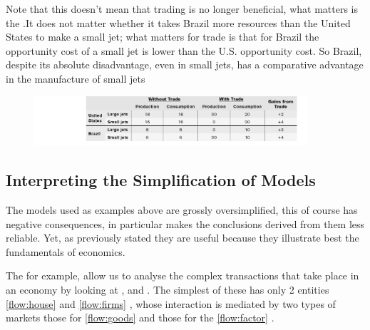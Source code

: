 \documentclass[english,course,draft]{Notes}
\begin{document}
\par{Note that this doesn't mean that trading is no longer beneficial, what matters is the .It
does not matter whether it takes Brazil more resources than the United States to make a small jet; what matters for trade is that for Brazil the opportunity cost of a small jet is lower than the U.S. opportunity cost. So Brazil, despite its absolute
disadvantage, even in small jets, has a comparative advantage in the manufacture of small jets}

\begin{figure}[ht]
\centering
\includegraphics[width=0.9\textwidth]{jetsTrade2}
\end{figure}

\subsection{Interpreting the Simplification of Models}
\par{The models used as examples above are grossly oversimplified, this of course has negative consequences, in particular makes the conclusions derived from them less reliable. Yet, as previously stated they are useful because they  illustrate best the fundamentals of economics.}

\par{The  for example, allow us to analyse the complex transactions that take place in an economy by looking at , and . The simplest of these has only 2 entities  \ref{flow:house}  and \ref{flow:firms} , whose interaction is mediated by two types of markets those for \ref{flow:goods}  and those for the \ref{flow:factor} .}

\newpage
\end{document}
